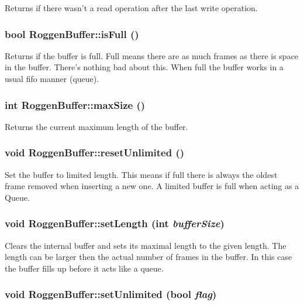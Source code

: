 \label{classRoggenBuffer_a1e2fe9957cfdf7db79678d929809efb0}
Returns if there wasn't a read operation after the last write operation. \hypertarget{classRoggenBuffer_a7eefcb649046e2e5929b76c890b07269}{
\subsubsection[{isFull}]{\setlength{\rightskip}{0pt plus 5cm}bool RoggenBuffer::isFull ()}}
\label{classRoggenBuffer_a7eefcb649046e2e5929b76c890b07269}
Returns if the buffer is full. Full means there are as much frames as there is space in the buffer. There's nothing bad about this. When full the buffer works in a usual fifo manner (queue). \hypertarget{classRoggenBuffer_ad64ee4593f5d4c488f3f18a9c0c558ab}{
\subsubsection[{maxSize}]{\setlength{\rightskip}{0pt plus 5cm}int RoggenBuffer::maxSize ()}}
\label{classRoggenBuffer_ad64ee4593f5d4c488f3f18a9c0c558ab}
Returns the current maximum length of the buffer. \hypertarget{classRoggenBuffer_a252d46936fdf42d67af3f0e28a9c43c2}{
\subsubsection[{resetUnlimited}]{\setlength{\rightskip}{0pt plus 5cm}void RoggenBuffer::resetUnlimited ()}}
\label{classRoggenBuffer_a252d46936fdf42d67af3f0e28a9c43c2}
Set the buffer to limited length. This means if full there is always the oldest frame removed when inserting a new one. A limited buffer is full when acting as a Queue. \hypertarget{classRoggenBuffer_ad37f32dca74267b357a68c781920b08b}{
\subsubsection[{setLength}]{\setlength{\rightskip}{0pt plus 5cm}void RoggenBuffer::setLength (int {\em bufferSize})}}
\label{classRoggenBuffer_ad37f32dca74267b357a68c781920b08b}
Clears the internal buffer and sets its maximal length to the given length. The length can be larger then the actual number of frames in the buffer. In this case the buffer fills up before it acts like a queue. \hypertarget{classRoggenBuffer_a3c0a581a4b554b63ad6ed8a1ee8c4d19}{
\subsubsection[{setUnlimited}]{\setlength{\rightskip}{0pt plus 5cm}void RoggenBuffer::setUnlimited (bool {\em flag})}}
